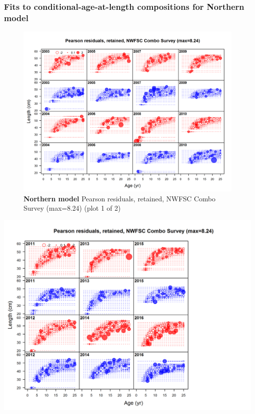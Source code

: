 \documentclass[12pt,]{article}
\begin{document}
\FloatBarrier

\newpage

\subsubsection{Fits to conditional-age-at-length compositions for
Northern
model}\label{fits-to-conditional-age-at-length-compositions-for-northern-model}

\begin{figure}[htbp]
\centering
\includegraphics{./r4ss/plots_mod1/comp_condAALfit_residsflt6mkt2_page1.png}
\caption{\textbf{Northern model} Pearson residuals, retained, NWFSC
Combo Survey (max=8.24) (plot 1 of 2)
\label{fig:mod1_1_comp_condAALfit_residsflt6mkt2_page1}}
\end{figure}

\includegraphics{./r4ss/plots_mod1/comp_condAALfit_residsflt6mkt2_page2.png}
\end{document}

